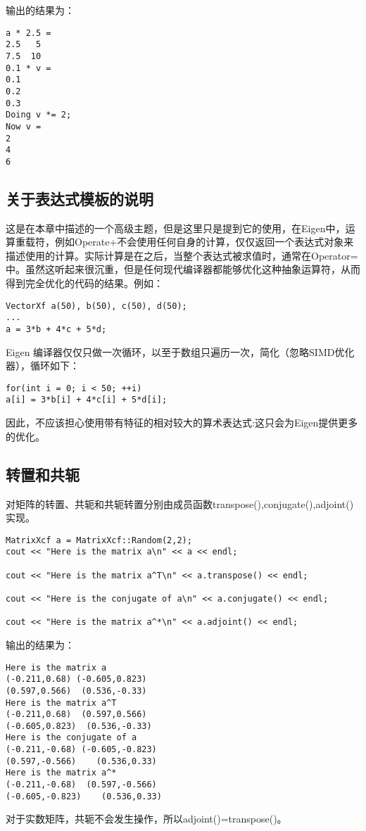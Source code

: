输出的结果为：
\begin{lstlisting}
a * 2.5 =
2.5   5
7.5  10
0.1 * v =
0.1
0.2
0.3
Doing v *= 2;
Now v =
2
4
6
\end{lstlisting}

\subsection{关于表达式模板的说明}
这是在本章中描述的一个高级主题，但是这里只是提到它的使用，在Eigen中，运算重载符，例如Operate+不会使用任何自身的计算，仅仅返回一个表达式对象来描述使用的计算。实际计算是在之后，当整个表达式被求值时，通常在Operator=中。虽然这听起来很沉重，但是任何现代编译器都能够优化这种抽象运算符，从而得到完全优化的代码的结果。例如：

\begin{lstlisting}[style=Cpp]
VectorXf a(50), b(50), c(50), d(50);
...
a = 3*b + 4*c + 5*d;
\end{lstlisting}

Eigen 编译器仅仅只做一次循环，以至于数组只遍历一次，简化（忽略SIMD优化器），循环如下：
\begin{lstlisting}[style=Cpp]
for(int i = 0; i < 50; ++i)
a[i] = 3*b[i] + 4*c[i] + 5*d[i];
\end{lstlisting}
因此，不应该担心使用带有特征的相对较大的算术表达式:这只会为Eigen提供更多的优化。

\subsection{转置和共轭}

对矩阵的转置、共轭和共轭转置分别由成员函数transpose(),conjugate(),adjoint()实现。
\begin{lstlisting}[style=Cpp]
MatrixXcf a = MatrixXcf::Random(2,2);
cout << "Here is the matrix a\n" << a << endl;

cout << "Here is the matrix a^T\n" << a.transpose() << endl;

cout << "Here is the conjugate of a\n" << a.conjugate() << endl;

cout << "Here is the matrix a^*\n" << a.adjoint() << endl;
\end{lstlisting}
输出的结果为：
\begin{lstlisting}
Here is the matrix a
(-0.211,0.68) (-0.605,0.823)
(0.597,0.566)  (0.536,-0.33)
Here is the matrix a^T
(-0.211,0.68)  (0.597,0.566)
(-0.605,0.823)  (0.536,-0.33)
Here is the conjugate of a
(-0.211,-0.68) (-0.605,-0.823)
(0.597,-0.566)    (0.536,0.33)
Here is the matrix a^*
(-0.211,-0.68)  (0.597,-0.566)
(-0.605,-0.823)    (0.536,0.33)
\end{lstlisting}
对于实数矩阵，共轭不会发生操作，所以adjoint()=transpose()。

